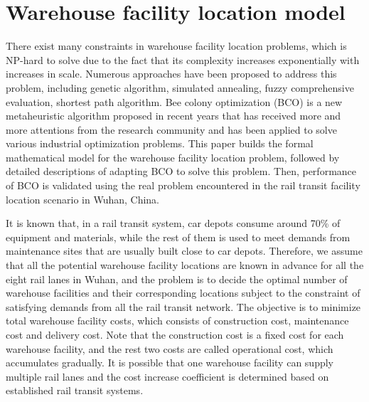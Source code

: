 \section{Warehouse facility location model}
There exist many constraints in warehouse facility location problems, which is NP-hard to solve due to the fact that its complexity increases exponentially with increases in scale.
Numerous approaches have been proposed to address this problem, including genetic algorithm, simulated annealing, fuzzy comprehensive evaluation, shortest path algorithm.
Bee colony optimization (BCO) is a new metaheuristic algorithm proposed in recent years that has received more and more attentions from the research community and has been applied to solve various industrial optimization problems.
This paper builds the formal mathematical model for the warehouse facility location problem, followed by detailed descriptions of adapting BCO to solve this problem.
Then, performance of BCO is validated using the real problem encountered in the rail transit facility location scenario in Wuhan, China.

It is known that, in a rail transit system, car depots consume around 70\% of equipment and materials, while the rest of them is used to meet demands from maintenance sites that are usually built close to car depots.
Therefore, we assume that all the potential warehouse facility locations are known in advance for all the eight rail lanes in Wuhan, and the problem is to decide the optimal number of warehouse facilities and their corresponding locations subject to the constraint of satisfying demands from all the rail transit network.
The objective is to minimize total warehouse facility costs, which consists of construction cost, maintenance cost and delivery cost.
Note that the construction cost is a fixed cost for each warehouse facility, and the rest two costs are called operational cost, which accumulates gradually.
It is possible that one warehouse facility can supply multiple rail lanes and the cost increase coefficient is determined based on established rail transit systems.

